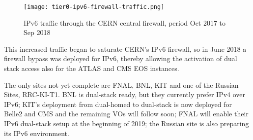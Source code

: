  \begin{figure}[h!]
\texttt{[image: tier0-ipv6-firewall-traffic.png]}
\caption{IPv6 traffic through the CERN central firewall, period Oct 2017 to Sep 2018}
\label{fig:tier0-traffic}
\end{figure}
 
This increased traffic began to saturate CERN's IPv6 firewall, so in June 2018 a
firewall bypass was deployed for IPv6,
thereby allowing the activation of dual stack access also for the ATLAS and CMS EOS instances.    
 


The only sites not yet complete are FNAL, BNL, KIT and one of the Russian Sites, RRC-KI-T1. 
BNL is dual-stack ready, but they currently prefer IPv4 over IPv6; KIT's deployment from dual-homed to dual-stack is now deployed for Belle2 and CMS and the remaining VOs will follow soon; 
FNAL will enable their IPv6 dual-stack setup at the beginning of 2019; the Russian site is also preparing its IPv6 environment.




